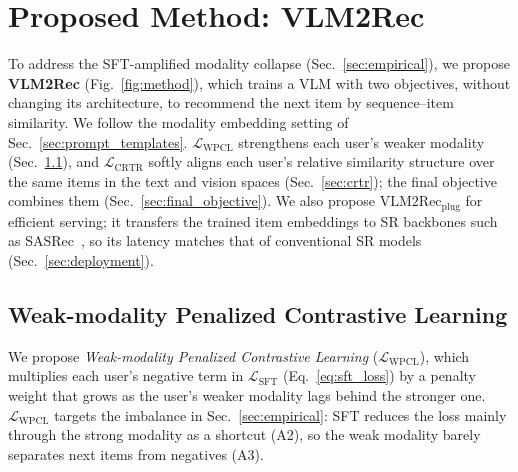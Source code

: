 

\section{Proposed Method: VLM2Rec}
\label{sec:methods}

To address the SFT-amplified modality collapse (Sec.~\ref{sec:empirical}), we propose \textbf{VLM2Rec} (Fig.~\ref{fig:method}), which trains a VLM with two objectives, without changing its architecture, to recommend the next item by sequence--item similarity.
We follow the modality embedding setting of Sec.~\ref{sec:prompt_templates}.
$\mathcal{L}_{\text{WPCL}}$ strengthens each user's weaker modality (Sec.~\ref{sec:wpcl}), and $\mathcal{L}_{\text{CRTR}}$ softly aligns each user's relative similarity structure over the same items in the text and vision spaces (Sec.~\ref{sec:crtr}); the final objective combines them (Sec.~\ref{sec:final_objective}).
We also propose $\text{VLM2Rec}_{\text{plug}}$ for efficient serving; it transfers the trained item embeddings to SR backbones such as SASRec~\cite{sasrec}, so its latency matches that of conventional SR models (Sec.~\ref{sec:deployment}).

\subsection{Weak-modality Penalized Contrastive Learning}
\label{sec:wpcl}
We propose \textit{Weak-modality Penalized Contrastive Learning} ($\mathcal{L}_{\text{WPCL}}$), which multiplies each user's negative term in $\mathcal{L}_{\text{SFT}}$ (Eq.~\ref{eq:sft_loss}) by a penalty weight that grows as the user's weaker modality lags behind the stronger one.
$\mathcal{L}_{\text{WPCL}}$ targets the imbalance in Sec.~\ref{sec:empirical}: SFT reduces the loss mainly through the strong modality as a shortcut (A2), so the weak modality barely separates next items from negatives (A3).

